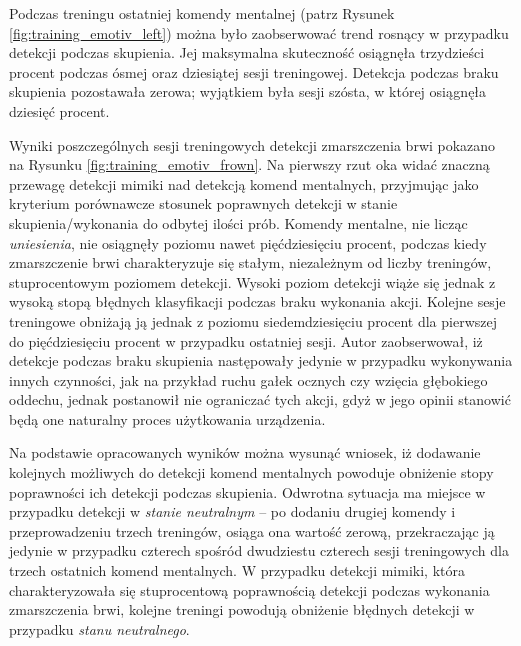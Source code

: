 \documentclass[skorowidz,skroty]{dyplomWEZUT}
\begin{document}
Podczas treningu ostatniej komendy mentalnej (patrz Rysunek \vref{fig:training_emotiv_left}) można było zaobserwować trend rosnący w przypadku detekcji podczas skupienia. Jej maksymalna skuteczność osiągnęła trzydzieści procent podczas ósmej oraz dziesiątej sesji treningowej. Detekcja podczas braku skupienia pozostawała zerowa; wyjątkiem była sesji szósta, w której osiągnęła dziesięć procent. 

Wyniki poszczególnych sesji treningowych detekcji zmarszczenia brwi pokazano na Rysunku \vref{fig:training_emotiv_frown}. Na pierwszy rzut oka widać znaczną przewagę detekcji mimiki nad detekcją komend mentalnych, przyjmując jako kryterium porównawcze stosunek poprawnych detekcji w stanie skupienia/wykonania do odbytej ilości prób. Komendy mentalne, nie licząc \textit{uniesienia}, nie osiągnęły poziomu nawet pięćdziesięciu procent, podczas kiedy zmarszczenie brwi charakteryzuje się stałym, niezależnym od liczby treningów, stuprocentowym poziomem detekcji. Wysoki poziom detekcji wiąże się jednak z wysoką stopą błędnych klasyfikacji podczas braku wykonania akcji. Kolejne sesje treningowe obniżają ją jednak z poziomu siedemdziesięciu procent dla pierwszej do pięćdziesięciu procent w przypadku ostatniej sesji. Autor zaobserwował, iż detekcje podczas braku skupienia następowały jedynie w przypadku wykonywania innych czynności, jak na przykład ruchu gałek ocznych czy wzięcia głębokiego oddechu, jednak postanowił nie ograniczać tych akcji, gdyż w jego opinii stanowić będą one naturalny proces użytkowania urządzenia.

Na podstawie opracowanych wyników można wysunąć wniosek, iż dodawanie kolejnych możliwych do detekcji komend mentalnych powoduje obniżenie stopy poprawności ich detekcji podczas skupienia. Odwrotna sytuacja ma miejsce w przypadku detekcji w \textit{stanie neutralnym} -- po dodaniu drugiej komendy i przeprowadzeniu trzech treningów, osiąga ona wartość zerową, przekraczając ją jedynie w przypadku czterech spośród dwudziestu czterech sesji treningowych dla trzech ostatnich komend mentalnych. W przypadku detekcji mimiki, która charakteryzowała się stuprocentową poprawnością detekcji podczas wykonania zmarszczenia brwi, kolejne treningi powodują obniżenie błędnych detekcji w przypadku \textit{stanu neutralnego}.
\end{document}
